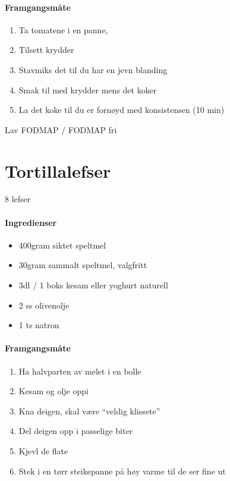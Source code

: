 \documentclass[12pt,a4paper]{book}
\begin{document}
\paragraph{Framgangsmåte}
\begin{enumerate}[noitemsep]
	\item Ta tomatene i en panne,
	\item Tilsett krydder
	\item Stavmiks det til du har en jevn blanding
	\item Smak til med krydder mens det koker
	\item La det koke til du er fornøyd med konsistensen (10 min)
	
\end{enumerate}

Lav FODMAP / FODMAP fri
\clearpage{}
\clearpage{}\section{﻿Tortillalefser}
\label{tortillalefser}
8 lefser

\paragraph{Ingredienser}
\begin{itemize}[noitemsep]
	\item 400gram siktet speltmel
	\item 30gram sammalt speltmel, valgfritt
	\item 3dl / 1 boks kesam eller yoghurt naturell
	\item 2 ss olivenolje
	\item 1 ts natron
\end{itemize}

\paragraph{Framgangsmåte}
\begin{enumerate}[noitemsep]
	\item Ha halvparten av melet i en bolle
	\item Kesam og olje oppi
	\item Kna deigen, skal være “veldig klissete”
	\item Del deigen opp i passelige biter
	\item Kjevl de flate
	\item Stek i en tørr steikepanne på høy varme til de ser fine ut
\end{enumerate}
\end{document}
